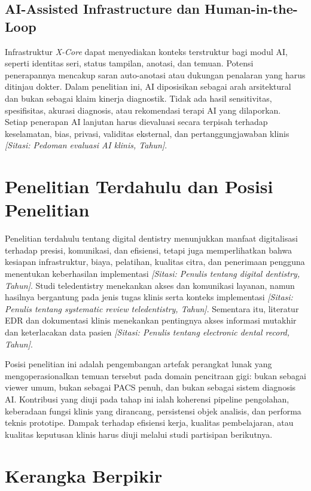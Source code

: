 \documentclass[12pt,a4paper,oneside]{report}
\newcommand{\sitasi}[1]{\textit{[Sitasi: #1]}}
\newcommand{\xcore}{\textit{X-Core}}
\begin{document}
\subsection{AI-Assisted Infrastructure dan Human-in-the-Loop}

Infrastruktur \xcore{} dapat menyediakan konteks terstruktur bagi modul AI, seperti identitas seri, status tampilan, anotasi, dan temuan. Potensi penerapannya mencakup saran auto-anotasi atau dukungan penalaran yang harus ditinjau dokter. Dalam penelitian ini, AI diposisikan sebagai arah arsitektural dan bukan sebagai klaim kinerja diagnostik. Tidak ada hasil sensitivitas, spesifisitas, akurasi diagnosis, atau rekomendasi terapi AI yang dilaporkan. Setiap penerapan AI lanjutan harus dievaluasi secara terpisah terhadap keselamatan, bias, privasi, validitas eksternal, dan pertanggungjawaban klinis \sitasi{Pedoman evaluasi AI klinis, Tahun}.

\section{Penelitian Terdahulu dan Posisi Penelitian}

Penelitian terdahulu tentang digital dentistry menunjukkan manfaat digitalisasi terhadap presisi, komunikasi, dan efisiensi, tetapi juga memperlihatkan bahwa kesiapan infrastruktur, biaya, pelatihan, kualitas citra, dan penerimaan pengguna menentukan keberhasilan implementasi \sitasi{Penulis tentang digital dentistry, Tahun}. Studi teledentistry menekankan akses dan komunikasi layanan, namun hasilnya bergantung pada jenis tugas klinis serta konteks implementasi \sitasi{Penulis tentang systematic review teledentistry, Tahun}. Sementara itu, literatur EDR dan dokumentasi klinis menekankan pentingnya akses informasi mutakhir dan keterlacakan data pasien \sitasi{Penulis tentang electronic dental record, Tahun}.

Posisi penelitian ini adalah pengembangan artefak perangkat lunak yang mengoperasionalkan temuan tersebut pada domain pencitraan gigi: bukan sebagai viewer umum, bukan sebagai PACS penuh, dan bukan sebagai sistem diagnosis AI. Kontribusi yang diuji pada tahap ini ialah koherensi pipeline pengolahan, keberadaan fungsi klinis yang dirancang, persistensi objek analisis, dan performa teknis prototipe. Dampak terhadap efisiensi kerja, kualitas pembelajaran, atau kualitas keputusan klinis harus diuji melalui studi partisipan berikutnya.

\section{Kerangka Berpikir}
\end{document}
